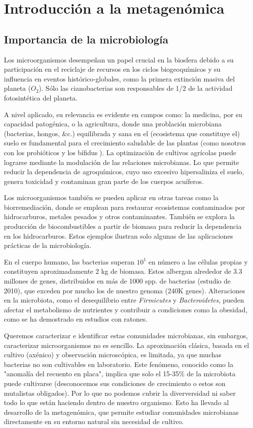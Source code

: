 \chapter{Introducción a la metagenómica}
\section{Importancia de la microbiología}
Los microorganismos desempeñan un papel crucial en la biosfera debido a su participación en el reciclaje de recursos en los ciclos biogeoquímicos y su influencia en eventos histórico-globales, como la primera extinción masiva del planeta ($O_2$). Sólo las cianobacterias son responsables de 1/2 de la actividad fotosintética del planeta. %

A nivel aplicado, su relevancia es evidente en campos como: la medicina, por su capacidad patogénica, o la agricultura, donde una problación microbiana (bacterias, hongos, &c.) equilibrada y sana en el (ecosistema que constituye el) suelo es fundamental para el crecimiento saludable de las plantas (como nosotros con los probióticos y los bífidus👺). La optimización de cultivos agrícolas puede lograrse mediante la modulación de las relaciones microbianas. Lo que permite reducir la dependencia de agroquímicos, cuyo uso excesivo hipersaliniza el suelo, genera toxicidad y contaminan gran parte de los cuerpos acuíferos. 

Los microorganismos también se pueden aplicar en otras tareas como la biorremediación, donde se emplean para restaurar ecosistemas contaminados por hidrocarburos, metales pesados y otros contaminantes. También se explora la producción de biocombustibles a partir de biomasa para reducir la dependencia en los hidrocarburos. Estos ejemplos ilustran solo algunas de las aplicaciones prácticas de la microbiología.

En el cuerpo humano, las bacterias superan $10^1$ en número a las células propias y constituyen aproximadamente 2 kg de biomasa. Estos albergan alrededor de 3.3 millones de genes, distribuidos en más de 1000 spp. de bacterias (estudio de 2010), que exceden por mucho los de nuestro genoma (240K genes). Alteraciones en la microbiota, como el desequilibrio entre \textit{Firmicutes} y \textit{Bacteroidetes}, pueden afectar el metabolismo de nutrientes y contribuir a condiciones como la obesidad, como se ha demostrado en estudios con ratones. %

Queremos caracterizar e identificar estas comunidades microbianas, sin embargos, caracterizar microorganismos no es sencillo. La aproximación clásica, basada en el cultivo (axénico) y observación microscópica, es limitada, ya que muchas bacterias no son cultivables en laboratorio. Este fenómeno, conocido como la "anomalía del recuento en placa", implica que solo el 15-35\% de la microbiota puede cultivarse (desconocemos sus condiciones de crecimiento o estos son mutalistas obligados). Por lo que no podemos cubrir la diverversidad ni saber todo lo que están haciendo dentro de nuestro organismo. Esto ha llevado al desarrollo de la metagenómica, que permite estudiar comunidades microbianas directamente en su entorno natural sin necesidad de cultivo.

